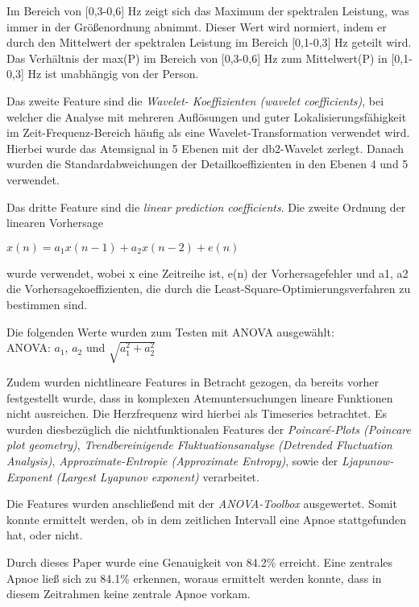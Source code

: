 Im Bereich von [0,3-0,6] Hz zeigt sich das Maximum der spektralen Leistung, was immer in der Größenordnung abnimmt. 
Dieser Wert wird normiert, indem er durch den Mittelwert der spektralen Leistung im Bereich [0,1-0,3] Hz geteilt wird. 
Das Verhältnis der max(P) im Bereich von [0,3-0,6] Hz zum Mittelwert(P) in [0,1-0,3] Hz ist unabhängig von der Person.

Das zweite Feature sind die \textit{Wavelet- Koeffizienten (wavelet coefficients)}, bei welcher die Analyse mit mehreren Auflösungen und guter Lokalisierungsfähigkeit im Zeit-Frequenz-Bereich häufig als eine Wavelet-Transformation verwendet wird. 
Hierbei wurde das Atemsignal in 5 Ebenen mit der db2-Wavelet zerlegt. Danach wurden die Standardabweichungen der Detailkoeffizienten in den Ebenen 4 und 5 verwendet. 

Das dritte Feature sind die \textit{linear prediction coefficients}. 
Die zweite Ordnung der linearen Vorhersage
\begin{center}
    $x(n) = a_1 x(n-1) + a_2 x(n-2) + e(n)$
\end{center} 
wurde verwendet, wobei x eine Zeitreihe ist, e(n) der Vorhersagefehler und {a1, a2} die Vorhersagekoeffizienten, die durch die Least-Square-Optimierungsverfahren zu bestimmen sind.

Die folgenden Werte wurden zum Testen mit ANOVA ausgewählt: \\
ANOVA: $a_1$, $a_2$ und $\sqrt{a_1^{2} + a_2^{2}}$


Zudem wurden nichtlineare Features in Betracht gezogen, da bereits vorher festgestellt wurde, dass in komplexen Atemuntersuchungen lineare Funktionen nicht ausreichen. Die Herzfrequenz wird hierbei als Timeseries betrachtet.
Es wurden diesbezüglich die nichtfunktionalen Features der \textit{Poincaré-Plots (Poincare plot geometry)}, \textit{Trendbereinigende Fluktuationsanalyse (Detrended Fluctuation Analysis)}, \textit{Approximate-Entropie (Approximate Entropy)}, sowie der \textit{Ljapunow-Exponent (Largest Lyapunov exponent)} verarbeitet. 

Die Features wurden anschließend mit der \textit{ANOVA-Toolbox} ausgewertet.
Somit konnte ermittelt werden, ob in dem zeitlichen Intervall eine Apnoe stattgefunden hat, oder nicht.

Durch dieses Paper wurde eine Genauigkeit von 84.2\% erreicht.
Eine zentrales Apnoe ließ sich zu 84.1\% erkennen, woraus ermittelt werden konnte, dass in diesem Zeitrahmen keine zentrale Apnoe vorkam.


